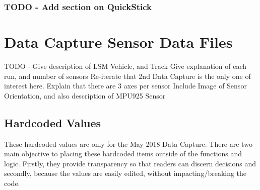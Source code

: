 \documentclass[]{article}
\begin{document}
\hypertarget{todo---add-section-on-quickstick}{%
\subsubsection{TODO - Add section on
QuickStick}\label{todo---add-section-on-quickstick}}

\newpage

\hypertarget{data-capture-sensor-data-files}{%
\section{Data Capture Sensor Data
Files}\label{data-capture-sensor-data-files}}

TODO - Give description of LSM Vehicle, and Track Give explanation of
each run, and number of sensors Re-iterate that 2nd Data Capture is the
only one of interest here. Explain that there are 3 axes per sensor
Include Image of Sensor Orientation, and also description of MPU925
Sensor

\hypertarget{hardcoded-values}{%
\subsection{Hardcoded Values}\label{hardcoded-values}}

These hardcoded values are only for the May 2018 Data Capture. There are
two main objective to placing these hardcoded items outside of the
functions and logic. Firstly, they provide transparency so that readers
can discern decisions and secondly, because the values are easily
edited, without impacting/breaking the code.
\end{document}
